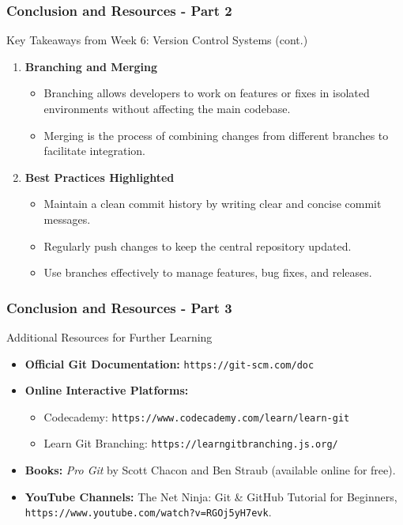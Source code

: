 \documentclass{beamer}
\begin{document}
\begin{frame}[fragile]
    \frametitle{Conclusion and Resources - Part 2}
    \begin{block}{Key Takeaways from Week 6: Version Control Systems (cont.)}
        \begin{enumerate}[resume]
            \item \textbf{Branching and Merging}
                \begin{itemize}
                    \item Branching allows developers to work on features or fixes in isolated environments without affecting the main codebase.
                    \item Merging is the process of combining changes from different branches to facilitate integration.
                \end{itemize}
            \item \textbf{Best Practices Highlighted}
                \begin{itemize}
                    \item Maintain a clean commit history by writing clear and concise commit messages.
                    \item Regularly push changes to keep the central repository updated.
                    \item Use branches effectively to manage features, bug fixes, and releases.
                \end{itemize}
        \end{enumerate}
    \end{block}
\end{frame}

\begin{frame}[fragile]
    \frametitle{Conclusion and Resources - Part 3}
    \begin{block}{Additional Resources for Further Learning}
        \begin{itemize}
            \item \textbf{Official Git Documentation:} \texttt{https://git-scm.com/doc}
            \item \textbf{Online Interactive Platforms:}
                \begin{itemize}
                    \item Codecademy: \texttt{https://www.codecademy.com/learn/learn-git}
                    \item Learn Git Branching: \texttt{https://learngitbranching.js.org/}
                \end{itemize}
            \item \textbf{Books:} \textit{Pro Git} by Scott Chacon and Ben Straub (available online for free).
            \item \textbf{YouTube Channels:} The Net Ninja: Git \& GitHub Tutorial for Beginners, \texttt{https://www.youtube.com/watch?v=RGOj5yH7evk}.
        \end{itemize}
    \end{block}
\end{frame}
\end{document}
